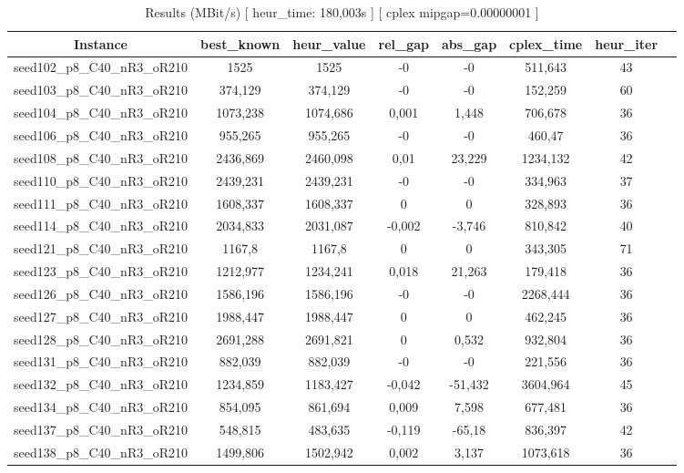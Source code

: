 \documentclass[a4paper]{article}
\begin{document}
\begin{center}
\begin{longtable}{cccccccc}
\caption{Results (MBit/s) [ heur\_time: 180,003s ]  [ cplex mipgap=0.00000001 ]}
\tabularnewline
\hline
Instance & best\_known & heur\_value & rel\_gap & abs\_gap & cplex\_time & heur\_iter\\
\hline
seed102\_p8\_C40\_nR3\_oR210 & 1525 & 1525 & -0 & -0 & 511,643 & 43\\
\hline
seed103\_p8\_C40\_nR3\_oR210 & 374,129 & 374,129 & -0 & -0 & 152,259 & 60\\
\hline
seed104\_p8\_C40\_nR3\_oR210 & 1073,238 & 1074,686 & 0,001 & 1,448 & 706,678 & 36\\
\hline
seed106\_p8\_C40\_nR3\_oR210 & 955,265 & 955,265 & -0 & -0 & 460,47 & 36\\
\hline
seed108\_p8\_C40\_nR3\_oR210 & 2436,869 & 2460,098 & 0,01 & 23,229 & 1234,132 & 42\\
\hline
seed110\_p8\_C40\_nR3\_oR210 & 2439,231 & 2439,231 & -0 & -0 & 334,963 & 37\\
\hline
seed111\_p8\_C40\_nR3\_oR210 & 1608,337 & 1608,337 & 0 & 0 & 328,893 & 36\\
\hline
seed114\_p8\_C40\_nR3\_oR210 & 2034,833 & 2031,087 & -0,002 & -3,746 & 810,842 & 40\\
\hline
seed121\_p8\_C40\_nR3\_oR210 & 1167,8 & 1167,8 & 0 & 0 & 343,305 & 71\\
\hline
seed123\_p8\_C40\_nR3\_oR210 & 1212,977 & 1234,241 & 0,018 & 21,263 & 179,418 & 36\\
\hline
seed126\_p8\_C40\_nR3\_oR210 & 1586,196 & 1586,196 & -0 & -0 & 2268,444 & 36\\
\hline
seed127\_p8\_C40\_nR3\_oR210 & 1988,447 & 1988,447 & 0 & 0 & 462,245 & 36\\
\hline
seed128\_p8\_C40\_nR3\_oR210 & 2691,288 & 2691,821 & 0 & 0,532 & 932,804 & 36\\
\hline
seed131\_p8\_C40\_nR3\_oR210 & 882,039 & 882,039 & -0 & -0 & 221,556 & 36\\
\hline
seed132\_p8\_C40\_nR3\_oR210 & 1234,859 & 1183,427 & -0,042 & -51,432 & 3604,964 & 45\\
\hline
seed134\_p8\_C40\_nR3\_oR210 & 854,095 & 861,694 & 0,009 & 7,598 & 677,481 & 36\\
\hline
seed137\_p8\_C40\_nR3\_oR210 & 548,815 & 483,635 & -0,119 & -65,18 & 836,397 & 42\\
\hline
seed138\_p8\_C40\_nR3\_oR210 & 1499,806 & 1502,942 & 0,002 & 3,137 & 1073,618 & 36\\

\end{longtable}
\end{center}
\end{document}
